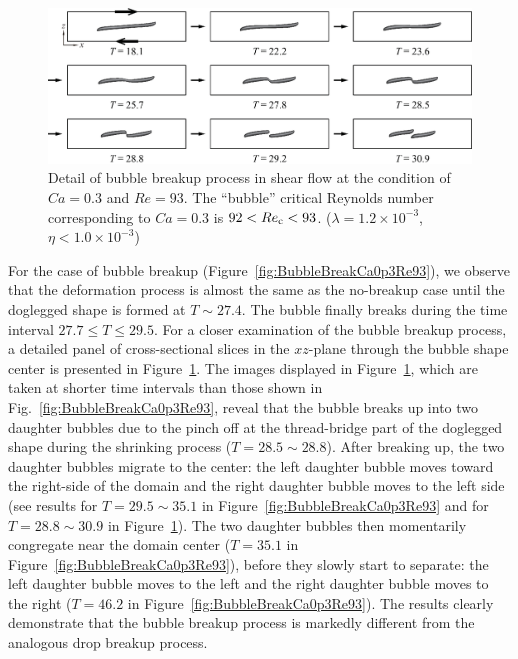 \documentclass[review]{elsarticle}
\begin{document}
%
\begin{figure}%
  \centering
  \includegraphics[width=\textwidth]{7-BubBreakCa0p3Re93Detail}
  \caption{Detail of bubble breakup process in shear flow at the condition
           of $Ca=0.3$ and $Re=93$.
	   The ``bubble'' 
	   critical Reynolds number corresponding to $Ca=0.3$ is
	   $92<Re_{\rm c}<93$.
           ($\lambda = 1.2 \times 10^{-3}$, $\eta < 1.0 \times 10^{-3}$) 
	   }
  \label{fig:BubBreakCa0p3Re93Detail}
\end{figure}
%
For the case of bubble breakup (Figure~\ref{fig:BubbleBreakCa0p3Re93}), we
observe that the deformation process is almost the same as the no-breakup case
until the doglegged shape is formed at $T \sim 27.4$. The bubble finally breaks
during the time interval $27.7 \leq T \leq 29.5$.  For a closer examination of
the bubble breakup process, a detailed panel of cross-sectional slices in the
$xz$-plane through the bubble shape center is presented in
Figure~\ref{fig:BubBreakCa0p3Re93Detail}.  The images displayed in
Figure~\ref{fig:BubBreakCa0p3Re93Detail}, which are taken at shorter time
intervals than those shown in Fig.~\ref{fig:BubbleBreakCa0p3Re93}, reveal that
the bubble breaks up into two daughter bubbles due to the pinch off at the
thread-bridge part of the doglegged shape during the shrinking process ($T =
28.5 \sim 28.8$).  After breaking up, the two daughter bubbles migrate to the
center: the left daughter bubble moves toward the right-side of the domain and
the right daughter bubble moves to the left side (see results for $T = 29.5
\sim 35.1$ in Figure~\ref{fig:BubbleBreakCa0p3Re93} and for $T = 28.8 \sim
30.9$ in Figure~\ref{fig:BubBreakCa0p3Re93Detail}).  The two daughter bubbles
then momentarily congregate near the domain center ($T = 35.1$ in
Figure~\ref{fig:BubbleBreakCa0p3Re93}), before they slowly start to separate:
the left daughter bubble moves to the left and the right daughter bubble moves
to the right ($T = 46.2$ in Figure~\ref{fig:BubbleBreakCa0p3Re93}).  The
results clearly demonstrate that the bubble breakup process is markedly
different from the analogous drop breakup process. 
\end{document}
